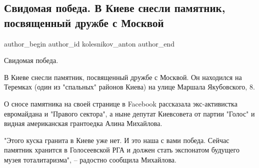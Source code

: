  
 
 
 
 
 
\subsection{Свидомая победа. В Киеве снесли памятник, посвященный дружбе с Москвой}
\label{sec:06_09_2021.fb.kolesnikov_anton.1.kiev_pamjatnik_druzhba_moskva}
 
\ifcmt
 author_begin
   author_id kolesnikov_anton
 author_end
\fi

Свидомая победа.

В Киеве снесли памятник, посвященный дружбе с Москвой. Он находился на Теремках
(один из "спальных" районов Киева) на улице Маршала Якубовского, 8. 


О сносе памятника на своей странице в Facebook рассказала экс-активистка
евромайдана и "Правого сектора", а ныне депутат Киевсовета от партии "Голос" и
видная американская грантоедка Алина Михайлова. 

"Этого куска гранита в Киеве уже нет. И это наша с вами победа. Сейчас памятник
хранится в Голосеевской РГА и должен стать экспонатом будущего музея
тоталитаризма", – радостно сообщила Михайлова.

